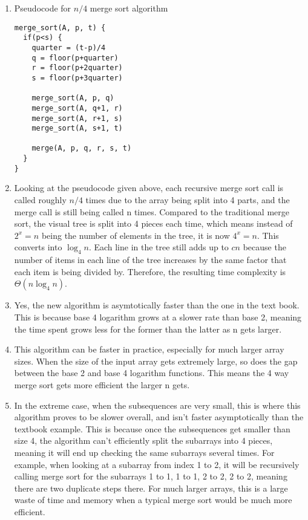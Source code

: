 \documentclass[11pt]{article}
\begin{document}
\begin{enumerate}
\item Pseudocode for $n/4$ merge sort algorithm
\begin{verbatim}
merge_sort(A, p, t) {
  if(p<s) {
    quarter = (t-p)/4
    q = floor(p+quarter)
    r = floor(p+2quarter)
    s = floor(p+3quarter)

    merge_sort(A, p, q)
    merge_sort(A, q+1, r)
    merge_sort(A, r+1, s)
    merge_sort(A, s+1, t)

    merge(A, p, q, r, s, t)
  }
}
\end{verbatim}

\newpage

\item Looking at the pseudocode given above, each recursive merge sort call is called roughly $n/4$ times due to the array being split into 4 parts, and the merge call is still being called n times. Compared to the traditional merge sort, the visual tree is split into 4 pieces each time, which means instead of $2^x=n$ being the number of elements in the tree, it is now $4^x=n$. This converts into $\log _4n$. Each line in the tree still adds up to $cn$ because the number of items in each line of the tree increases by the same factor that each item is being divided by. Therefore, the resulting time complexity is $\Theta (n\log _4n)$.

\item Yes, the new algorithm is asymtotically faster than the one in the text book. This is because base 4 logarithm grows at a slower rate than base 2, meaning the time spent grows less for the former than the latter as n gets larger.

\item This algorithm can be faster in practice, especially for much larger array sizes. When the size of the input array gets extremely large, so does the gap between the base 2 and base 4 logarithm functions. This means the 4 way merge sort gets more efficient the larger n gets.

\item In the extreme case, when the subsequences are very small, this is where this algorithm proves to be slower overall, and isn't faster asymptotically than the textbook example. This is because once the subsequences get smaller than size 4, the algorithm can't efficiently split the subarrays into 4 pieces, meaning it will end up checking the same subarrays several times. For example, when looking at a subarray from index 1 to 2, it will be recursively calling merge sort for the subarrays 1 to 1, 1 to 1, 2 to 2, 2 to 2, meaning there are two duplicate steps there. For much larger arrays, this is a large waste of time and memory when a typical merge sort would be much more efficient.


\end{enumerate}
\end{document}
